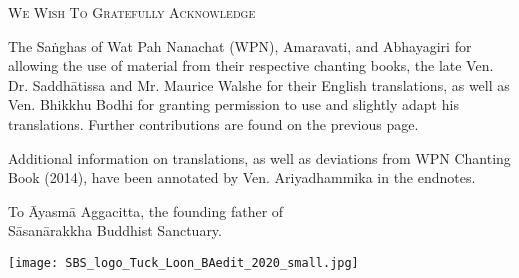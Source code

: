 \cleartorecto
\thispagestyle{empty}

{\setlength{\parskip}{10pt}

{\centering\fontsize{20}{25}\selectfont
\textsc{We Wish To Gratefully Acknowledge}
\par}

The Saṅghas of Wat Pah Nanachat (WPN), Amaravati, and Abhayagiri for allowing the use of material from their respective chanting books, the late Ven. Dr. Saddhātissa and Mr. Maurice Walshe for their English translations, as well as Ven. Bhikkhu Bodhi for granting permission to use and slightly adapt his translations. Further contributions are found on the previous page.

\vspace*{1.5\baselineskip}

Additional information on translations, as well as deviations
from WPN Chanting Book (2014), have been annotated by Ven. Ariyadhammika in the endnotes.

\bigskip

{\centering
To Āyasmā Aggacitta, the founding father of\\
Sāsanārakkha Buddhist Sanctuary.

\bigskip

\texttt{[image: SBS\_logo\_Tuck\_Loon\_BAedit\_2020\_small.jpg]}

}

}
